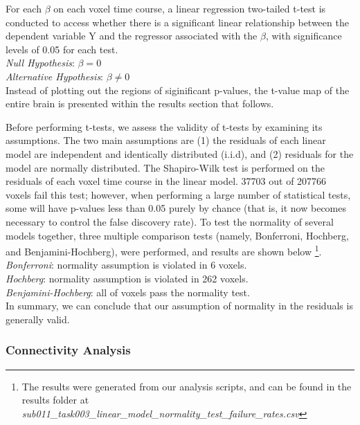 \documentclass[11pt]{article}
\begin{document}
For each $\beta$ on each voxel time course, a linear regression two-tailed
t-test is conducted to access whether there is a significant linear relationship
between the dependent variable Y and the regressor associated with the $\beta$,
with significance levels of 0.05 for each test. \\
 
\textit{Null Hypothesis}: $ \beta = 0$ \\

\textit{Alternative Hypothesis}: $\beta \neq 0$ \\

Instead of plotting out the regions of siginificant p-values, the t-value map of
the entire brain is presented within the results section that follows. 

Before performing t-tests, we assess the validity of t-tests by examining its
assumptions. The two main assumptions are (1) the residuals of each linear model
are independent and identically distributed (i.i.d), and (2) residuals for the model
are normally distributed. The Shapiro-Wilk test is performed on the residuals of
each voxel time course in the linear model. 37703 out of 207766 voxels fail this
test; however, when performing a large number of statistical tests, some will have
p-values less than 0.05 purely by chance (that is, it now becomes necessary to control the false discovery rate). To test the normality of several models together, three multiple comparison tests (namely, Bonferroni, Hochberg, and Benjamini-Hochberg), were performed, and results are shown below \footnote{The results were generated from our analysis scripts, and can be found in the results folder at \textit{sub011\_task003\_linear\_model\_normality\_test\_failure\_rates.csv}}. \\

\textit{Bonferroni}: normality assumption is violated in 6 voxels. \\

\textit{Hochberg}: normality assumption is violated in 262 voxels. \\

\textit{Benjamini-Hochberg}: all of voxels pass the normality test. \\

In summary, we can conclude that our assumption of normality in the residuals is
generally valid.

\subsubsection{Connectivity Analysis}
\end{document}
